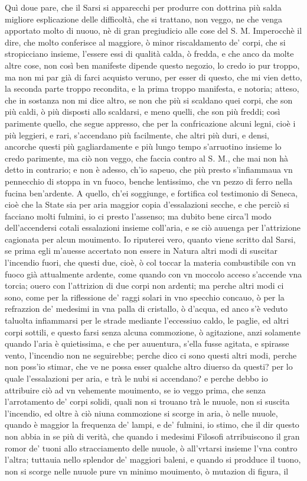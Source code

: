 \documentclass[11pt,twoside,openany]{book}
\begin{document}
Quì doue pare, che il Sarsi si apparecchi per produrre con dottrina più salda migliore esplicazione delle difficoltà, che si trattano, non veggo, ne che venga apportato molto di nuouo, nè di gran pregiudicio alle cose del S. M. Imperocchè il dire, che molto conferisce al maggiore, ò minor riscaldamento de' corpi, che si stropicciano insieme, l'essere essi di qualità calda, ò fredda, e che anco da molte altre cose, non così ben manifeste dipende questo negozio, lo credo io pur troppo, ma non mi par già di farci acquisto veruno, per esser di questo, che mi vien detto, la seconda parte troppo recondita, e la prima troppo manifesta, e notoria; atteso, che in sostanza non mi dice altro, se non che più si scaldano quei corpi, che son più caldi, ò più disposti allo scaldarsi, e meno quelli, che son più freddi; così parimente quello, che segue appresso, che per la confricazione alcuni legni, cioè i più leggieri, e rari, s'accendano più facilmente, che altri più duri, e densi, ancorche questi più gagliardamente e più lungo tempo s'arruotino insieme lo credo parimente, ma ciò non veggo, che faccia contro al S. M., che mai non hà detto in contrario; e non è adesso, ch'io sapeuo, che più presto s'infiammaua vn pennecchio di stoppa in vn fuoco, benche lentissimo, che vn pezzo di ferro nella fucina ben'ardente. A quello, ch'ei soggiunge, e fortifica col testimonio di Seneca, cioè che la State sia per aria maggior copia d'essalazioni secche, e che perciò si facciano molti fulmini, io ci presto l'assenso; ma dubito bene circa'l modo dell'accendersi cotali essalazioni insieme coll'aria, e se ciò auuenga per l'attrizione cagionata per alcun mouimento. Io riputerei vero, quanto viene scritto dal Sarsi, se prima egli m'auesse accertato non essere in Natura altri modi di suscitar l'incendio fuori, che questi due, cioè, ò col toccar la materia combustibile con vn fuoco già attualmente ardente, come quando con vn moccolo acceso s'accende vna torcia; ouero con l'attrizion di due corpi non ardenti; ma perche altri modi ci sono, come per la riflessione de' raggi solari in vno specchio concauo, ò per la refrazzion de' medesimi in vna palla di cristallo, ò d'acqua, ed anco s'è veduto taluolta infiammarsi per le strade mediante l'eccessiuo caldo, le paglie, ed altri corpi sottili, e questo farsi senza alcuna commozione, ò agitazione, anzi solamente quando l'aria è quietissima, e che per auuentura, s'ella fusse agitata, e spirasse vento, l'incendio non ne seguirebbe; perche dico ci sono questi altri modi, perche non poss'io stimar, che ve ne possa esser qualche altro diuerso da questi? per lo quale l'essalazioni per aria, e trà le nubi si accendano? e perche debbo io attribuire ciò ad vn vehemente mouimento, se io veggo prima, che senza l'arrotamento de' corpi solidi, quali non si trouano trà le nuuole, non si suscita l'incendio, ed oltre à ciò niuna commozione si scorge in aria, ò nelle nuuole, quando è maggior la frequenza de' lampi, e de' fulmini, io stimo, che il dir questo non abbia in se più di verità, che quando i medesimi Filosofi atrribuiscono il gran romor de' tuoni allo stracciamento delle nuuole, ò all'vrtarsi insieme l'vna contro l'altra; tuttauia nello splendor de' maggiori baleni, e quando si prodduce il tuono, non si scorge nelle nuuole pure vn minimo mouimento, ò mutazion di figura, il 
\end{document}
